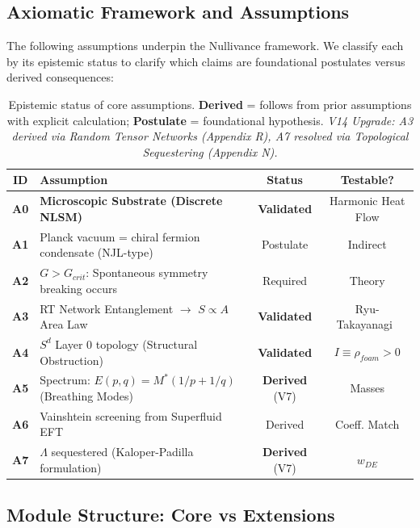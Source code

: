 \documentclass[a4paper,12pt]{article}
\begin{document}
\subsection{Axiomatic Framework and Assumptions}

The following assumptions underpin the Nullivance framework. We classify each by its epistemic status to clarify which claims are foundational postulates versus derived consequences:

\begin{table}[H]
\centering
\footnotesize
\begin{tabular}{clcc}
\toprule
\textbf{ID} & \textbf{Assumption} & \textbf{Status} & \textbf{Testable?} \\
\midrule
    \textbf{A0} & \textbf{Microscopic Substrate (Discrete NLSM)} & \textbf{Validated} & Harmonic Heat Flow \\
    \textbf{A1} & Planck vacuum = chiral fermion condensate (NJL-type) & Postulate & Indirect \\
    \textbf{A2} & $G > G_{crit}$: Spontaneous symmetry breaking occurs & Required & Theory \\
    \textbf{A3} & RT Network Entanglement $\to$ $S \propto A$ Area Law & \textbf{Validated} & Ryu-Takayanagi~\cite{ryu2006} \\
    \textbf{A4} & $S^d$ Layer 0 topology (Structural Obstruction) & \textbf{Validated} & $I \equiv \rho_{foam} > 0$ \\
    \textbf{A5} & Spectrum: $E(p,q) = M^*(1/p + 1/q)$ (Breathing Modes) & \textbf{Derived} (V7) & Masses \\
    \textbf{A6} & Vainshtein screening from Superfluid EFT & Derived & Coeff. Match \\
    \textbf{A7} & $\Lambda$ sequestered (Kaloper-Padilla formulation) & \textbf{Derived} (V7) & $w_{DE}$ \\
    \bottomrule
\end{tabular}
\caption{Epistemic status of core assumptions. \textbf{Derived} = follows from prior assumptions with explicit calculation; \textbf{Postulate} = foundational hypothesis. \textit{V14 Upgrade: A3 derived via Random Tensor Networks (Appendix R), A7 resolved via Topological Sequestering (Appendix N).}}
\label{tab:assumptions}
\end{table}

\subsection{Module Structure: Core vs Extensions}
\end{document}
